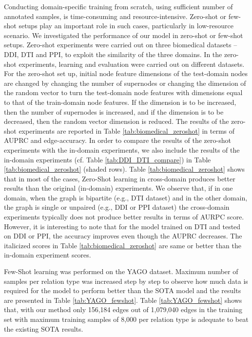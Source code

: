 Conducting domain-specific training from scratch, using sufficient number of annotated samples, is time-consuming and resource-intensive. Zero-shot or few-shot setups play an important role in such cases, particularly in low-resource scenario.
We investigated the performance of our model in zero-shot or few-shot setups. Zero-shot experiments were carried out on three biomedical datasets -- DDI, DTI and PPI, to exploit the similarity of the three domains. In the zero-shot experiments, learning and evaluation were carried out on different datasets. For the zero-shot set up, initial node feature dimensions of the test-domain nodes are changed by changing the number of supernodes or changing the dimension of the random vector to turn the test-domain node features with dimensions equal to that of the train-domain node features. If the dimension is to be increased, then the number of supernodes is increased, and if the dimension is to be decreased, then the random vector dimension is reduced. The results of the zero-shot experiments are reported in Table \ref{tab:biomedical_zeroshot} in terms of AUPRC and edge-accuracy. In order to compare the results of the zero-shot experiments with the in-domain experiments, we also include the results of the in-domain experiments (cf. Table \ref{tab:DDI_DTI_compare}) in Table \ref{tab:biomedical_zeroshot} (shaded rows). Table \ref{tab:biomedical_zeroshot} shows that in most of the cases, Zero-Shot learning in cross-domain produces better results than the original (in-domain) experiments. We observe that, if in one domain, when the graph is bipartite (e.g., DTI dataset) and in the other domain, the graph is single or unpaired (e.g., DDI or PPI dataset) the cross-domain experiments typically does not produce better results in terms of AURPC score. However, it is interesting to note that for the model trained on DTI and tested on DDI or PPI, the accuracy improves even though the AUPRC decreases. The italicized scores in Table \ref{tab:biomedical_zeroshot} are same or better than the in-domain experiment scores. 



Few-Shot learning was performed on the YAGO dataset. Maximum number of samples per relation type was increased step by step to observe how much data is required for the model to perform better than the
SOTA model and the results are presented in Table \ref{tab:YAGO_fewshot}. Table \ref{tab:YAGO_fewshot} shows that, with our method only 156,184 edges out of 1,079,040 edges in the training set with maximum training samples of 8,000 per relation type is adequate to beat the existing SOTA results. 
